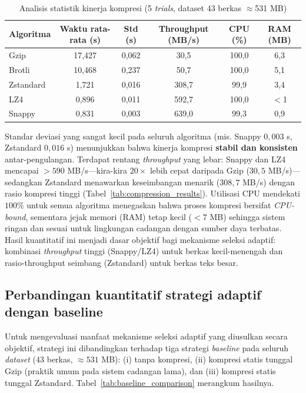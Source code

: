 \documentclass{iaesarticle}
\begin{document}
\begin{table}[H]
\centering
\fontsize{8pt}{10pt}\selectfont
\caption{Analisis statistik kinerja kompresi (5 \textit{trials}, dataset 43 berkas $\approx$531 MB)}
\label{tab:comp_stats}
\begin{tabular}{l c c c c c}
\hline
\textbf{Algoritma} & \textbf{Waktu rata-rata (s)} & \textbf{Std (s)} & \textbf{Throughput (MB/s)} & \textbf{CPU (\%)} & \textbf{RAM (MB)} \\
\hline
Gzip      & 17,427 & 0,062 & 30,5  & 100,0 & 6,3 \\
Brotli    & 10,468 & 0,237 & 50,7  & 100,0 & 5,1 \\
Zstandard & 1,721  & 0,016 & 308,7 & 99,9  & 3,4 \\
LZ4       & 0,896  & 0,011 & 592,7 & 100,0 & $<$1 \\
Snappy    & 0,831  & 0,003 & 639,0 & 99,3  & 0,9 \\
\hline
\end{tabular}
\end{table}

Standar deviasi yang sangat kecil pada seluruh algoritma (mis. Snappy $0{,}003$ s, Zstandard $0{,}016$ s) menunjukkan bahwa kinerja kompresi \textbf{stabil dan konsisten} antar-pengulangan. Terdapat rentang \textit{throughput} yang lebar: Snappy dan LZ4 mencapai $>590$ MB/s---kira-kira $20\times$ lebih cepat daripada Gzip ($30{,}5$ MB/s)---sedangkan Zstandard menawarkan keseimbangan menarik ($308{,}7$ MB/s) dengan rasio kompresi tinggi (Tabel~\ref{tab:compression_results}). Utilisasi CPU mendekati $100\%$ untuk semua algoritma menegaskan bahwa proses kompresi bersifat \textit{CPU-bound}, sementara jejak memori (RAM) tetap kecil ($<7$ MB) sehingga sistem ringan dan sesuai untuk lingkungan cadangan dengan sumber daya terbatas. Hasil kuantitatif ini menjadi dasar objektif bagi mekanisme seleksi adaptif: kombinasi \textit{throughput} tinggi (Snappy/LZ4) untuk berkas kecil-menengah dan rasio-throughput seimbang (Zstandard) untuk berkas teks besar.

\subsection{Perbandingan kuantitatif strategi adaptif dengan baseline}
Untuk mengevaluasi manfaat mekanisme seleksi adaptif yang diusulkan secara objektif, strategi ini dibandingkan terhadap tiga strategi \textit{baseline} pada seluruh \textit{dataset} (43 berkas, $\approx 531$ MB): (i) tanpa kompresi, (ii) kompresi statis tunggal Gzip (praktik umum pada sistem cadangan lama), dan (iii) kompresi statis tunggal Zstandard. Tabel~\ref{tab:baseline_comparison} merangkum hasilnya.
\end{document}

